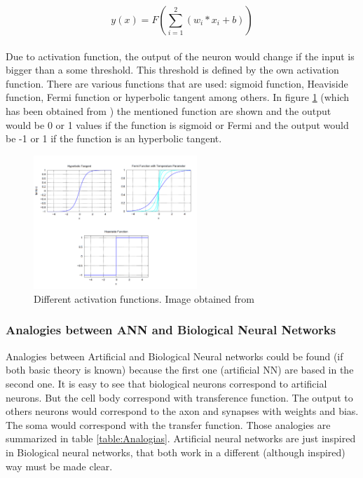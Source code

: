 			\begin{equation}
			y(x)=F(\sum_{i=1}^{2} (w_{i}*x_{i} + b) )
			\label{eq:ecuation_neuronasencilla}
			\end{equation}\\


Due to activation function, the output of the neuron would change if the input is bigger than a some threshold. This threshold is defined by the own activation function. There are various functions that are used: sigmoid function, Heaviside function, Fermi function or hyperbolic tangent among others. In figure \ref{fig:activation_function} (which has been obtained from \cite{BINN}) the mentioned function are shown and the output would be 0 or 1 values if the function is sigmoid or Fermi and the output would be -1 or 1 if the function is an hyperbolic tangent. \\

\begin{figure}[htb]
\centering
\includegraphics[width=0.55\textwidth]{images_miscelaneus/activation_function.PNG}
\caption{Different activation functions. Image obtained from \cite{BINN}} \label{fig:activation_function}
\end{figure}

\subsubsection{Analogies between ANN and Biological Neural Networks}
Analogies between Artificial and Biological Neural networks could be found (if both basic theory is known) because the first one (artificial NN) are based in the second one. It is easy to see that biological neurons correspond to artificial neurons. But the cell body correspond with transference function. The output to others neurons would correspond to the axon and synapses with weights and bias. The soma would correspond with the transfer function. Those analogies are summarized in table \ref{table:Analogias}. Artificial neural networks are just inspired in Biological neural networks, that both work in a different (although inspired) way must be made clear.\\

